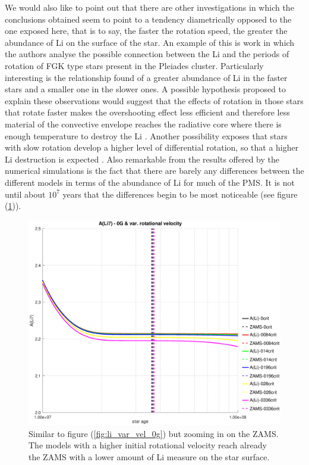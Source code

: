 \documentclass[fleqn,usenatbib]{mnras}
\begin{document}
We would also like to point out that there are other investigations in which the conclusions obtained seem to point to a tendency diametrically opposed to the one exposed here, that is to say, the faster the rotation speed, the greater the abundance of Li on the surface of the star. An example of this is \citet{Bouvier2018} work in which the authors analyse the possible connection between the Li and the periods of rotation of FGK type stars present in the Pleiades cluster. Particularly interesting is the relationship found of a greater abundance of Li in the faster stars and a smaller one in the slower ones. A possible hypothesis proposed to explain these observations would suggest that the effects of rotation in those stars that rotate faster makes the overshooting effect less efficient and therefore less material of the convective envelope reaches the radiative core where there is enough temperature to destroy the Li \citep{Baraffe2017}. Another possibility exposes that stars with slow rotation develop a higher level of differential rotation, so that a higher Li destruction is expected \citep{Bouvier2008}. Also remarkable from the results offered by the numerical simulations is the fact that there are barely any differences between the different models in terms of the abundance of Li for much of the PMS. It is not until about $10^7$ years that the differences begin to be most noticeable (see figure (\ref{fig:li_var_vel_0g_z1})).\par

\begin{figure}
	\includegraphics[trim = 35mm 15mm 20mm 15mm, clip,width=\columnwidth]{figures/li_var_vel_0_0g_z1.eps}
    \caption {Similar to figure (\ref{fig:li_var_vel_0g}) but zooming in on the ZAMS. The models with a higher initial rotational velocity reach already the ZAMS with a lower amount of Li measure on the star surface.}
    \label{fig:li_var_vel_0g_z1}
\end{figure}
\end{document}

